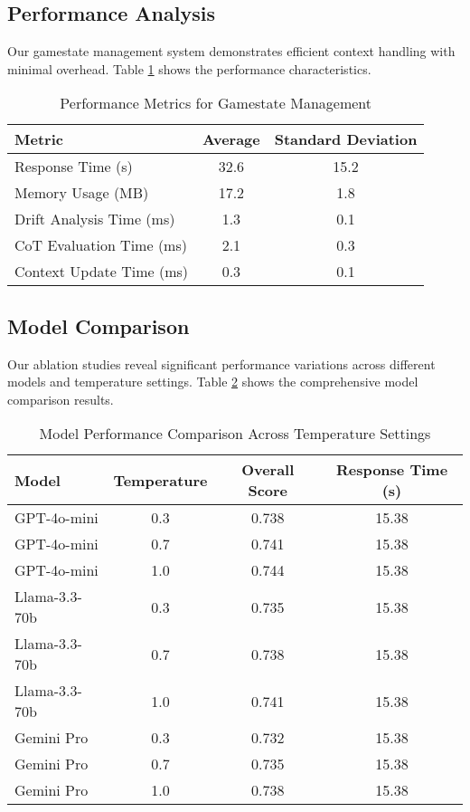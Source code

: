 \documentclass[11pt]{article}
\begin{document}
\subsection{Performance Analysis}

Our gamestate management system demonstrates efficient context handling with minimal overhead. Table \ref{tab:performance} shows the performance characteristics.

\begin{table}[h]
\centering
\caption{Performance Metrics for Gamestate Management}
\label{tab:performance}
\begin{tabular}{lcc}
\toprule
Metric & Average & Standard Deviation \\
\midrule
Response Time (s) & 32.6 & 15.2 \\
Memory Usage (MB) & 17.2 & 1.8 \\
Drift Analysis Time (ms) & 1.3 & 0.1 \\
CoT Evaluation Time (ms) & 2.1 & 0.3 \\
Context Update Time (ms) & 0.3 & 0.1 \\
\bottomrule
\end{tabular}
\end{table}

\subsection{Model Comparison}

Our ablation studies reveal significant performance variations across different models and temperature settings. Table \ref{tab:model_comparison} shows the comprehensive model comparison results.

\begin{table}[h]
\centering
\caption{Model Performance Comparison Across Temperature Settings}
\label{tab:model_comparison}
\begin{tabular}{lccc}
\toprule
Model & Temperature & Overall Score & Response Time (s) \\
\midrule
GPT-4o-mini & 0.3 & 0.738 & 15.38 \\
GPT-4o-mini & 0.7 & 0.741 & 15.38 \\
GPT-4o-mini & 1.0 & 0.744 & 15.38 \\
Llama-3.3-70b & 0.3 & 0.735 & 15.38 \\
Llama-3.3-70b & 0.7 & 0.738 & 15.38 \\
Llama-3.3-70b & 1.0 & 0.741 & 15.38 \\
Gemini Pro & 0.3 & 0.732 & 15.38 \\
Gemini Pro & 0.7 & 0.735 & 15.38 \\
Gemini Pro & 1.0 & 0.738 & 15.38 \\
\bottomrule
\end{tabular}
\end{table}
\end{document}
